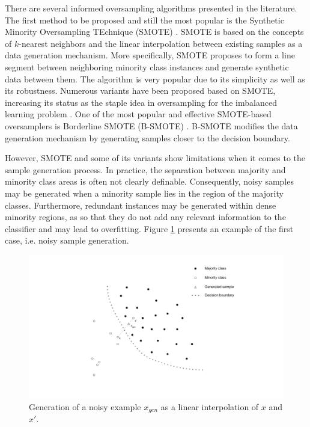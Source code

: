 \documentclass[parskip=full]{scrartcl}
\begin{document}
There are several informed oversampling algorithms presented in the literature. The first method to be  proposed and still the most popular is the Synthetic Minority Oversampling TEchnique (SMOTE) \cite{Chawla.2002}. SMOTE is based on the concepts of \( k \)-nearest neighbors and the linear interpolation between existing samples as a data generation mechanism. More specifically, SMOTE proposes to form a line segment between neighboring minority class instances and generate synthetic data between them. The algorithm is very popular due to its simplicity as well as its robustness. Numerous variants have been proposed based on SMOTE, increasing its status as the staple idea in oversampling for the imbalanced learning problem \cite{Fernandez.2018}. One of the most popular and effective SMOTE-based oversamplers is Borderline SMOTE (B-SMOTE) \cite{Han.2005}. B-SMOTE modifies the data generation mechanism by generating
samples closer to the decision boundary.

However, SMOTE and some of its variants show limitations when it comes to the sample generation process. In practice, the separation between majority and minority class areas is often not clearly definable. Consequently, noisy samples may be generated when a minority sample lies in the region of the majority classes. Furthermore, redundant instances may be generated within dense minority regions, as so that they do not add any relevant information to the classifier and may lead to overfitting. Figure \ref{fig:noisy-examples} presents an example of the first case, i.e. noisy sample generation.

\begin{figure}[H]
	\centering
	\includegraphics[width=1.0\linewidth]{../analysis/noisy_examples.png}
	\caption{Generation of a noisy example $x_{gen}$ as a linear interpolation of $x$ and $x'$.}
	\label{fig:noisy-examples}
\end{figure}
\end{document}
